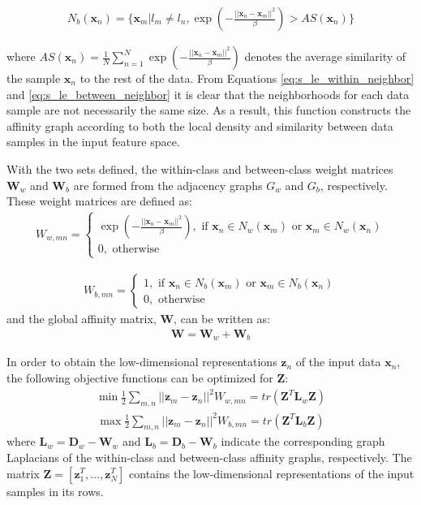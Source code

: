 \begin{align}
N_{b}(\bm{x}_n) = \{\bm{x}_m |l_{m} \neq l_{n}, \exp \left (- \frac{||\bm{x}_{n} - \bm{x}_{m} ||^{2}}{\beta} \right)  > AS(\bm{x}_{n}) \} \label{eq:s_le_between_neighbor}
\end{align}

\noindent
where $AS(\bm{x}_{n}) = \frac{1}{N} \sum_{n=1}^{N} \exp \left (- \frac{||\bm{x}_{n} - \bm{x}_{m} ||^{2}}{\beta} \right)$ denotes the average similarity of the sample  $\bm{x}_{n}$ to the rest of the data.  From Equations \ref{eq:s_le_within_neighbor} and \ref{eq:s_le_between_neighbor} it is clear that the neighborhoods for each data sample are not necessarily the same size.  As a result, this function constructs the affinity graph according to both the local density and similarity between data samples in the input feature space.

With the two sets defined, the within-class and between-class weight matrices $\bm{W}_{w}$ and $\bm{W}_{b}$ are formed from the adjacency graphs $G_{w}$ and $G_{b}$, respectively.  These weight matrices are defined as:
\begin{align}
	W_{w,mn} =
	\begin{cases}
		\exp \left (- \frac{||\bm{x}_{n} - \bm{x}_{m} ||^{2}}{\beta} \right), \text{ if } \bm{x}_{n} \in N_{w}(\bm{x}_{m}) \text{ or } \bm{x}_{m} \in N_{w}(\bm{x}_{n})  \\
		0, \text{ otherwise}
	\end{cases}
\end{align}

\begin{align}
	W_{b,mn} =
	\begin{cases}
		1, \text{ if } \bm{x}_{n} \in N_{b}(\bm{x}_{m}) \text{ or } \bm{x}_{m} \in N_{b}(\bm{x}_{n}) \\
	0, \text{ otherwise}
	\end{cases}
\end{align}
\noindent
and the global affinity matrix, $\bm{W}$, can be written as:
\begin{align}
	\bm{W} = \bm{W}_{w} + \bm{W}_{b}
\end{align}

In order to obtain the low-dimensional representations $\bm{z}_n$ of the input data $\bm{x}_{n}$, the following objective functions can be optimized for $\bm{Z}$:
\begin{align}
	\min \frac{1}{2} \sum_{m,n} || \bm{z}_{m} - \bm{z}_{n} ||^{2} W_{w,mn} = tr(\bm{Z}^{T}\bm{L}_{w}\bm{Z})
\end{align}
\begin{align}
\max \frac{1}{2} \sum_{m,n} || \bm{z}_{m} - \bm{z}_{n} ||^{2} W_{b,mn} = tr(\bm{Z}^{T}\bm{L}_{b}\bm{Z})
\end{align}
\noindent
where $\bm{L}_{w} = \bm{D}_{w} - \bm{W}_{w}$ and $\bm{L}_{b} = \bm{D}_{b} - \bm{W}_{b}$ indicate the corresponding graph Laplacians of the within-class and between-class affinity graphs, respectively.  The matrix $\bm{Z} = [\bm{z}^{T}_{1}, \dots, \bm{z}^{T}_{N}]$ contains the low-dimensional representations of the input samples in its rows.

